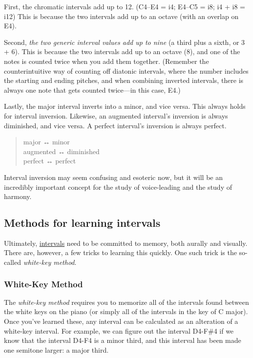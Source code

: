 \documentclass{book}
\begin{document}
First, the chromatic intervals add up to 12. (C4--E4 = i4; E4--C5 = i8; i4 +
i8 = i12) This is because the two intervals add up to an octave (with an
overlap on E4).

Second, \emph{the two generic interval values add up to nine} (a third plus a
sixth, or 3 + 6). This is because the two intervals add up to an octave (8),
and one of the notes is counted twice when you add them together. (Remember
the counterintuitive way of counting off diatonic intervals, where the number
includes the starting and ending pitches, and when combining inverted
intervals, there is always one note that gets counted twice---in this case,
E4.)

Lastly, the major interval inverts into a minor, and vice versa. This always
holds for interval inversion. Likewise, an augmented interval's inversion is
always diminished, and vice versa. A perfect interval's inversion is always
perfect.

\begin{quote}
major ↔ minor\\
augmented ↔ diminished\\
perfect ↔ perfect
\end{quote}

Interval inversion may seem confusing and esoteric now, but it will be an
incredibly important concept for the study of voice-leading and the study of
harmony.

\hypertarget{methods-for-learning-intervals}{%
\subsection{Methods for learning
intervals}\label{methods-for-learning-intervals}}

Ultimately, \href{intervals.html}{intervals} need to be committed to memory,
both aurally and visually. There are, however, a few tricks to learning this
quickly. One such trick is the so-called \emph{white-key method}.

\hypertarget{white-key-method}{%
\subsubsection{White-Key Method}\label{white-key-method}}

The \emph{white-key method} requires you to memorize all of the intervals
found between the white keys on the piano (or simply all of the intervals in
the key of C major). Once you've learned these, any interval can be calculated
as an alteration of a white-key interval. For example, we can figure out the
interval D4-F\#4 if we know that the interval D4-F4 is a minor third, and this
interval has been made one semitone larger: a major third.
\end{document}

